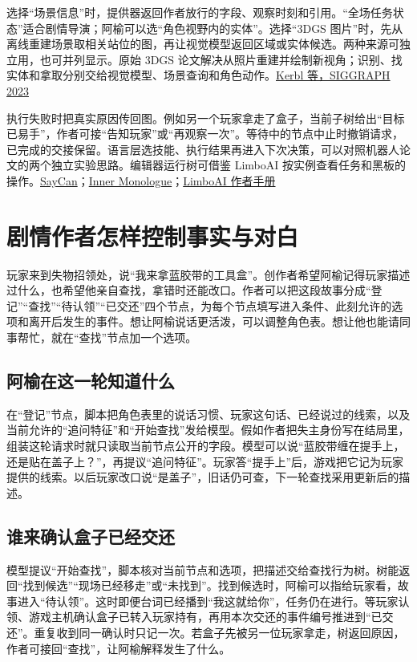 \documentclass[UTF8,11pt,fontset=fandol,a4paper]{ctexart}
\newcommand{\pg}[1]{\clearpage\section{#1}}
\newcommand{\src}[2]{\href{#1}{#2}}
\begin{document}
选择“场景信息”时，提供器返回作者放行的字段、观察时刻和引用。“全场任务状态”适合剧情导演；阿榆可以选“角色视野内的实体”。选择“3DGS 图片”时，先从离线重建场景取相关站位的图，再让视觉模型返回区域或实体候选。两种来源可独立用，也可并列显示。原始 3DGS 论文解决从照片重建并绘制新视角；识别、找实体和拿取分别交给视觉模型、场景查询和角色动作。\src{https://repo-sam.inria.fr/fungraph/3d-gaussian-splatting/}{Kerbl 等，SIGGRAPH 2023}

执行失败时把真实原因传回图。例如另一个玩家拿走了盒子，当前子树给出“目标已易手”，作者可接“告知玩家”或“再观察一次”。等待中的节点中止时撤销请求，已完成的交接保留。语言层选技能、执行结果再进入下次决策，可以对照机器人论文的两个独立实验思路。编辑器运行树可借鉴 LimboAI 按实例查看任务和黑板的操作。\src{https://say-can.github.io/}{SayCan}；\src{https://innermonologue.github.io/}{Inner Monologue}；\src{https://limboai.readthedocs.io/en/stable/behavior-trees/create-tree.html}{LimboAI 作者手册}

\pg{剧情作者怎样控制事实与对白}

玩家来到失物招领处，说“我来拿蓝胶带的工具盒”。创作者希望阿榆记得玩家描述过什么，也希望他亲自查找，拿错时还能改口。作者可以把这段故事分成“登记”“查找”“待认领”“已交还”四个节点，为每个节点填写进入条件、此刻允许的选项和离开后发生的事件。想让阿榆说话更活泼，可以调整角色表。想让他也能请同事帮忙，就在“查找”节点加一个选项。

\subsection*{阿榆在这一轮知道什么}

在“登记”节点，脚本把角色表里的说话习惯、玩家这句话、已经说过的线索，以及当前允许的“追问特征”和“开始查找”发给模型。假如作者把失主身份写在结局里，组装这轮请求时就只读取当前节点公开的字段。模型可以说“蓝胶带缠在提手上，还是贴在盖子上？”，再提议“追问特征”。玩家答“提手上”后，游戏把它记为玩家提供的线索。以后玩家改口说“是盖子”，旧话仍可查，下一轮查找采用更新后的描述。

\subsection*{谁来确认盒子已经交还}

模型提议“开始查找”，脚本核对当前节点和选项，把描述交给查找行为树。树能返回“找到候选”“现场已经移走”或“未找到”。找到候选时，阿榆可以指给玩家看，故事进入“待认领”。这时即便台词已经播到“我这就给你”，任务仍在进行。等玩家认领、游戏主机确认盒子已转入玩家持有，再用本次交还的事件编号推进到“已交还”。重复收到同一确认时只记一次。若盒子先被另一位玩家拿走，树返回原因，作者可接回“查找”，让阿榆解释发生了什么。
\end{document}
